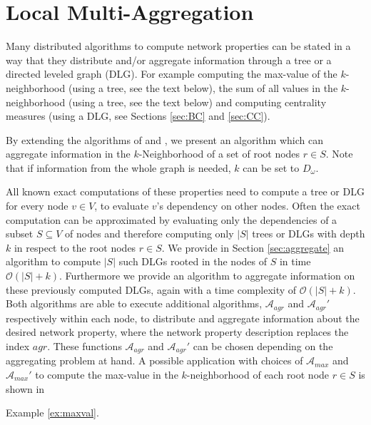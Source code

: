 \documentclass[11pt]{article}
\newcommand{\BO}{\mathcal{O}}
\newif\iffull
\newif\ifshort
\begin{document}
\section{Local Multi-Aggregation}
\label{sec:aggAlgo}
Many distributed algorithms to compute network properties can be stated in a way that they distribute and/or aggregate information through a tree or a directed leveled graph (DLG). For example computing the max-value of the $k$-neighborhood (using a tree, see the text below), the sum of all values in the $k$-neighborhood (using a tree, see the text below) and computing centrality measures (using a DLG, see Sections \ref{sec:BC} and \ref{sec:CC}).

By extending the algorithms of \cite{holzer2012optimal} and \cite{hochuli:holzer:MRCST}, we present an algorithm which can aggregate information in the $k$-Neighborhood of a set of root nodes $r\in S$. Note that if information from the whole graph is needed, $k$ can be set to $D_\omega$.

All known exact computations of these properties need to compute a tree or DLG for every node $v\in V$, to evaluate $v$'s dependency on other nodes.
Often the exact computation can be approximated by evaluating only the dependencies of a subset $S\subseteq V$ of nodes and therefore computing only $|S|$ trees or DLGs with depth $k$ in respect to the root nodes $r\in S$.
We provide in Section \ref{sec:aggregate} an algorithm to compute $|S|$ such DLGs rooted in the nodes of $S$ in time $\BO(|S|+k)$.
Furthermore we provide an algorithm to aggregate information on these previously computed DLGs, again with a time complexity of $\BO(|S|+k)$.
Both algorithms are able to execute additional algorithms, ${\mathcal{A}}_{agr}$ and ${\mathcal{A}}_{agr}'$ respectively within each node, to distribute and aggregate information about the desired network property, where the network property description replaces the index $agr$. These functions ${\mathcal{A}}_{agr}$ and ${\mathcal{A}}_{agr}'$ can be chosen depending on the aggregating problem at hand.
A possible application with choices of ${\mathcal{A}}_{max}$ and ${\mathcal{A}}_{max}'$ to compute the max-value in the $k$-neighborhood of each root node $r\in S$ is shown in 
\ifshort
Appendix \ref{FULL:sec:aggAlgo}, Example \ref{FULL:ex:maxval}.
\fi
\iffull
Example \ref{ex:maxval}.
\end{document}
